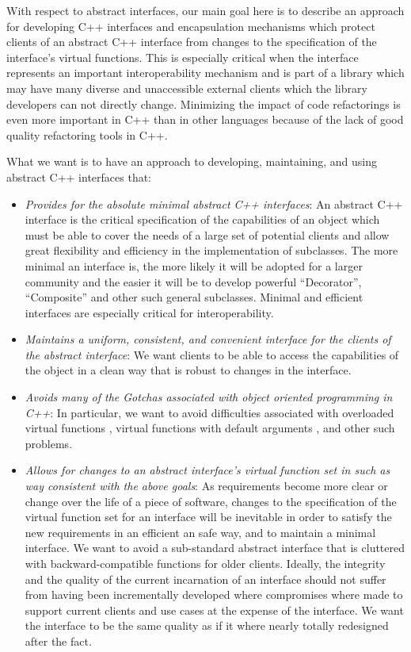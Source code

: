 \documentclass[pdf,ps2pdf,11pt]{SANDreport}
\begin{document}
With respect to abstract interfaces, our main goal here is to describe an
approach for developing C++ interfaces and encapsulation mechanisms which
protect clients of an abstract C++ interface from changes to the specification
of the interface's virtual functions.  This is especially critical when the
interface represents an important interoperability mechanism and is part of a
library which may have many diverse and unaccessible external clients which
the library developers can not directly change.  Minimizing the impact of code
refactorings is even more important in C++ than in other languages because of
the lack of good quality refactoring tools in C++.

What we want is to have an approach to developing, maintaining, and using
abstract C++ interfaces that:

\begin{itemize}

{}\item\textit{Provides for the absolute minimal abstract C++ interfaces}: An
abstract C++ interface is the critical specification of the capabilities of an
object which must be able to cover the needs of a large set of potential
clients and allow great flexibility and efficiency in the implementation of
subclasses.  The more minimal an interface is, the more likely it will be
adopted for a larger community and the easier it will be to develop powerful
``Decorator'', ``Composite'' and other such general subclasses.  Minimal and
efficient interfaces are especially critical for interoperability.

{}\item\textit{Maintains a uniform, consistent, and convenient interface for
the clients of the abstract interface}: We want clients to be able to access
the capabilities of the object in a clean way that is robust to changes in the
interface.

{}\item\textit{Avoids many of the Gotchas associated with object oriented
programming in C++}: In particular, we want to avoid difficulties associated
with overloaded virtual functions {}\cite[Item 73]{C++Gotchas03}, virtual
functions with default arguments {}\cite[Item 37]{EffectiveC++3rd}, and other
such problems.

{}\item\textit{Allows for changes to an abstract interface's virtual function
set in such as way consistent with the above goals}: As requirements become
more clear or change over the life of a piece of software, changes to the
specification of the virtual function set for an interface will be inevitable
in order to satisfy the new requirements in an efficient an safe way, and to
maintain a minimal interface.  We want to avoid a sub-standard abstract
interface that is cluttered with backward-compatible functions for older
clients.  Ideally, the integrity and the quality of the current incarnation of
an interface should not suffer from having been incrementally developed where
compromises where made to support current clients and use cases at the expense
of the interface.  We want the interface to be the same quality as if it where
nearly totally redesigned after the fact.


\end{itemize}
\end{document}
